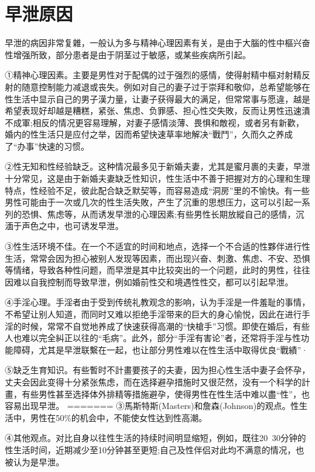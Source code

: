 \documentclass[12pt,UTF8]{ctexbook}
\begin{document}
\section{早泄原因}

早泄的病因非常复雜，一般认为多与精神心理因素有关，是由于大腦的性中樞兴奋性增强所致，部分患者是由于阴茎过于敏感，或某些疾病所引起。

①精神心理因素。主要是男性对于配偶的过于强烈的感情，使得射精中樞对射精反射的随意控制能力减退或丧失。例如对自己的妻子过于崇拜和敬仰，总希望能够在性生活中显示自己的男子漢力量，让妻子获得最大的满足，但常常事与愿違，越是希望表现好却越是糟糕，紧张、焦虑、负罪感、担心性交失敗，反而让男性迅速潰不成軍;相反的情况更容易理解，对妻子感情淡薄、畏惧和敵视，或者另有新歡，婚内的性生活只是应付之举，因而希望快速草率地解决“戰鬥”，久而久之养成了“办事”快速的习惯。

②性无知和性经验缺乏。这种情况最多见于新婚夫妻，尤其是蜜月裹的夫妻，早泄十分常见，这是由于新婚夫妻缺乏性知识，性生活中不善于把握对方的心理和生理特点，性经验不足，彼此配合缺乏默契等，而容易造成“洞房”里的不愉快。有一些男性可能由于一次或几次的性生活失敗，产生了沉重的思想压力，这可以引起一系列的恐惧、焦虑等，从而诱发早泄的心理因素;有些男性长期放縱自己的感情，沉湎于声色之中，也可诱发早泄。

③性生活环境不佳。在一个不适宜的时间和地点，选择一个不合适的性夥伴进行性生活，常常会因为担心被别人发现等因素，而出现兴奋、刺激、焦虑、不安、恐惧等情绪，导致各种性问题，而早泄是其中比较突出的一个问题，此时的男性，往往因难以自我控制而导致早泄，例如婚前性交和境遇性性交，都可以引起早泄。

④手淫心理。手淫者由于受到传统礼教观念的影响，认为手淫是一件羞耻的事情，不希望让别人知道，而同时又难以拒绝手淫带来的巨大的身心愉悦，因此在进行手淫的时候，常常不自觉地养成了快速获得高潮的“快槍手”习惯。即使在婚后，有些人也难以完全糾正以往的“毛病”。此外，部分“手淫有害论”者，还常将手淫与性功能障碍，尤其是早泄联繫在一起，也让部分男性难以在性生活中取得优良“戰績”·

⑤缺乏生育知识。有些暫时不計畫要孩子的夫妻，因为担心性生活中妻子会怀孕，丈夫会因此变得十分紧张焦虑，而在选择避孕措施时又很茫然，没有一个科学的計畫，有些男性甚至选择体外排精等措施避孕，使得男性在性生活中难以盡“性”，也容易出现早泄。
=======
③馬斯特斯(Masters)和詹森(Johnson)的观点。性生活中，男性在50\%的机会中，不能使女性达到性高潮。

④其他观点。对比自身以往性生活的持续时间明显缩短，例如，既往20~30分钟的性生活时间，近期减少至10分钟甚至更短;自己及性伴侣对此均不满意的情况，也被认为是早泄。
\end{document}
